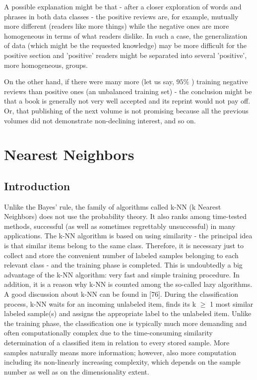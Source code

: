 \documentclass[11pt,openany,executivepaper]{book}
\begin{document}
A possible explanation might be that - after a closer exploration of words and phrases in both data classes - the positive reviews are, for example, mutually more different (readers like more things) while the negative ones are more homogeneous in terms of what readers dislike. In such a case, the generalization of data (which might be the requested knowledge) may be more difficult for the positive section and 'positive' readers might be separated into several 'positive', more homogeneous, groups.

On the other hand, if there were many more (let us say, $95 \%$ ) training negative reviews than positive ones (an unbalanced training set) - the conclusion might be that a book is generally not very well accepted and its reprint would not pay off. Or, that publishing of the next volume is not promising because all the previous volumes did not demonstrate non-declining interest, and so on.

\chapter{Nearest Neighbors}%

\section{Introduction}

Unlike the Bayes' rule, the family of algorithms called k-NN (k Nearest Neighbors) does not use the probability theory. It also ranks among time-tested methods, successful (as well as sometimes regrettably unsuccessful) in many applications.
The k-NN algorithm is based on using similarity - the principal idea is that
similar items belong to the same class. Therefore, it is necessary just to collect
and store the convenient number of labeled samples belonging to each relevant
class - and the training phase is completed. This is undoubtedly a big advantage
of the k-NN algorithm: very fast and simple training procedure. In addition, it
is a reason why k-NN is counted among the so-called lazy algorithms. A good
discussion about k-NN can be found in [76].
During the classification process, k-NN waits for an incoming unlabeled item,
finds its k $\geq$ 1 most similar labeled sample(s) and assigns the appropriate label to the unlabeled item. Unlike the training phase, the classification one is
typically much more demanding and often computationally complex due to the
time-consuming similarity determination of a classified item in relation to every stored sample. More samples naturally means more information; however,
also more computation including its non-linearly increasing complexity, which
depends on the sample number as well as on the dimensionality extent.
\end{document}
